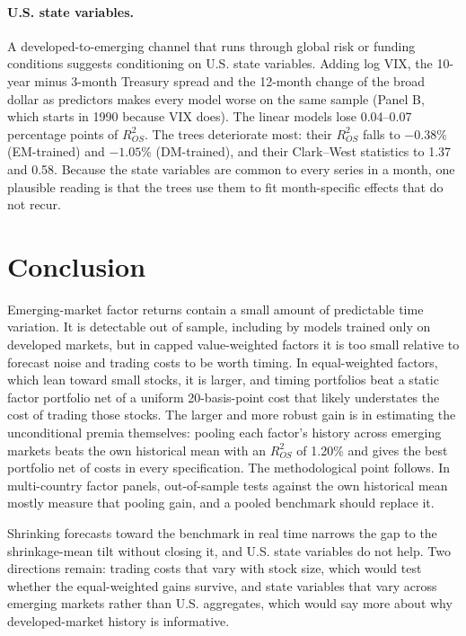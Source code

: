 \documentclass[11pt]{article}
\begin{document}
\paragraph{U.S. state variables.} A developed-to-emerging channel that runs through global risk or funding conditions suggests conditioning on U.S. state variables. Adding log VIX, the 10-year minus 3-month Treasury spread and the 12-month change of the broad dollar as predictors makes every model worse on the same sample (Panel B, which starts in 1990 because VIX does). The linear models lose 0.04--0.07 percentage points of $R^2_{OS}$. The trees deteriorate most: their $R^2_{OS}$ falls to $-0.38$\% (EM-trained) and $-1.05$\% (DM-trained), and their Clark--West statistics to 1.37 and 0.58. Because the state variables are common to every series in a month, one plausible reading is that the trees use them to fit month-specific effects that do not recur.



\section{Conclusion}
Emerging-market factor returns contain a small amount of predictable time variation. It is detectable out of sample, including by models trained only on developed markets, but in capped value-weighted factors it is too small relative to forecast noise and trading costs to be worth timing. In equal-weighted factors, which lean toward small stocks, it is larger, and timing portfolios beat a static factor portfolio net of a uniform 20-basis-point cost that likely understates the cost of trading those stocks. The larger and more robust gain is in estimating the unconditional premia themselves: pooling each factor's history across emerging markets beats the own historical mean with an $R^2_{OS}$ of 1.20\% and gives the best portfolio net of costs in every specification. The methodological point follows. In multi-country factor panels, out-of-sample tests against the own historical mean mostly measure that pooling gain, and a pooled benchmark should replace it.

Shrinking forecasts toward the benchmark in real time narrows the gap to the shrinkage-mean tilt without closing it, and U.S. state variables do not help. Two directions remain: trading costs that vary with stock size, which would test whether the equal-weighted gains survive, and state variables that vary across emerging markets rather than U.S. aggregates, which would say more about why developed-market history is informative.
\end{document}
